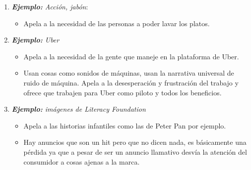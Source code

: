 \begin{enumerate}
    \item \emph{\textbf{Ejemplo: }Acción, jabón}:
        \begin{itemize}
            \item Apela a la necesidad de las personas a poder lavar los platos. 
        \end{itemize}

    \item \emph{\textbf{Ejemplo: }Uber}
        \begin{itemize}
            \item Apela a la necesidad de la gente que maneje en la plataforma de Uber.
            \item Usan cosas como sonidos de máquinas, usan la narrativa universal de ruido de máquina. Apela a la desesperación y frustración del trabajo y ofrece que trabajen para Uber como piloto y todos los beneficios.
        \end{itemize}
    
    \item \emph{\textbf{Ejemplo: }imágenes de Literacy Foundation}
        \begin{itemize}
            \item Apela a las historias infantiles como las de Peter Pan por ejemplo.
        \end{itemize}
        \begin{itemize}[label=\#]
            \item Hay anuncios que son un hit pero que no dicen nada, es básicamente una pérdida ya que a pesar de ser un anuncio llamativo desvía la atención del consumidor a cosas ajenas a la marca.
        \end{itemize}
\end{enumerate}
